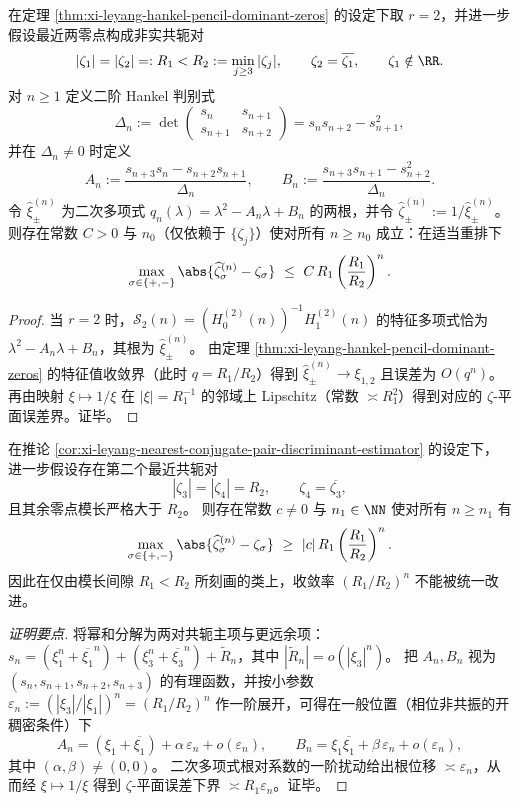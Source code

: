 \begin{corollary}\label{cor:xi-leyang-nearest-conjugate-pair-discriminant-estimator}
在定理 \ref{thm:xi-leyang-hankel-pencil-dominant-zeros} 的设定下取 \(r=2\)，并进一步假设最近两零点构成非实共轭对
\[
|\zeta_1|=|\zeta_2|=:R_1<R_2:=\min_{j\ge 3}|\zeta_j|,\qquad \zeta_2=\overline{\zeta_1},\qquad \zeta_1\notin\RR.
\]
对 \(n\ge 1\) 定义二阶 Hankel 判别式
\[
\Delta_n:=\det\begin{pmatrix}
s_n & s_{n+1}\\
s_{n+1} & s_{n+2}
\end{pmatrix}
=s_ns_{n+2}-s_{n+1}^2,
\]
并在 \(\Delta_n\neq 0\) 时定义
\[
A_n:=\frac{s_{n+3}s_n-s_{n+2}s_{n+1}}{\Delta_n},\qquad
B_n:=\frac{s_{n+3}s_{n+1}-s_{n+2}^2}{\Delta_n}.
\]
令 \(\widehat\xi_\pm^{(n)}\) 为二次多项式 \(q_n(\lambda)=\lambda^2-A_n\lambda+B_n\) 的两根，并令 \(\widehat\zeta_\pm^{(n)}:=1/\widehat\xi_\pm^{(n)}\)。
则存在常数 \(C>0\) 与 \(n_0\)（仅依赖于 \(\{\zeta_j\}\)）使对所有 \(n\ge n_0\) 成立：在适当重排下
\[
\max_{\sigma\in\{+,-\}}\abs{\widehat\zeta_\sigma^{(n)}-\zeta_\sigma}
\ \le\ C\,R_1\left(\frac{R_1}{R_2}\right)^{n}.
\]
\end{corollary}
\begin{proof}
当 \(r=2\) 时，\(\mathcal{S}_2(n)=(H_0^{(2)}(n))^{-1}H_1^{(2)}(n)\) 的特征多项式恰为
\(
\lambda^2-A_n\lambda+B_n
\)，其根为 \(\widehat\xi_\pm^{(n)}\)。
由定理 \ref{thm:xi-leyang-hankel-pencil-dominant-zeros} 的特征值收敛界（此时 \(q=R_1/R_2\)）得到
\(\widehat\xi_\pm^{(n)}\to \xi_{1,2}\) 且误差为 \(O(q^n)\)。
再由映射 \(\xi\mapsto 1/\xi\) 在 \(|\xi|=R_1^{-1}\) 的邻域上 Lipschitz（常数 \(\asymp R_1^2\)）得到对应的 \(\zeta\)-平面误差界。证毕。
\end{proof}

\begin{proposition}[指数收敛率的一般锐性]\label{prop:xi-leyang-exponential-rate-sharpness}
在推论 \ref{cor:xi-leyang-nearest-conjugate-pair-discriminant-estimator} 的设定下，进一步假设存在第二个最近共轭对
\[
|\zeta_3|=|\zeta_4|=R_2,\qquad \zeta_4=\overline{\zeta_3},
\]
且其余零点模长严格大于 \(R_2\)。
则存在常数 \(c\neq 0\) 与 \(n_1\in\NN\) 使对所有 \(n\ge n_1\) 有
\[
\max_{\sigma\in\{+,-\}}\abs{\widehat\zeta_\sigma^{(n)}-\zeta_\sigma}
\ \ge\ |c|\,R_1\left(\frac{R_1}{R_2}\right)^{n}.
\]
因此在仅由模长间隙 \(R_1<R_2\) 所刻画的类上，收敛率 \((R_1/R_2)^n\) 不能被统一改进。
\end{proposition}
\begin{proof}[证明要点]
将幂和分解为两对共轭主项与更远余项：
\(
s_n=(\xi_1^n+\overline{\xi_1}^n)+(\xi_3^n+\overline{\xi_3}^n)+\widetilde R_n
\)，其中 \(|\widetilde R_n|=o(|\xi_3|^n)\)。
把 \(A_n,B_n\) 视为 \((s_n,s_{n+1},s_{n+2},s_{n+3})\) 的有理函数，并按小参数
\(
\varepsilon_n:=(|\xi_3|/|\xi_1|)^n=(R_1/R_2)^n
\)
作一阶展开，可得在一般位置（相位非共振的开稠密条件）下
\[
A_n=(\xi_1+\overline{\xi_1})+\alpha\,\varepsilon_n+o(\varepsilon_n),\qquad
B_n=\xi_1\overline{\xi_1}+\beta\,\varepsilon_n+o(\varepsilon_n),
\]
其中 \((\alpha,\beta)\neq (0,0)\)。
二次多项式根对系数的一阶扰动给出根位移 \(\asymp \varepsilon_n\)，从而经 \(\xi\mapsto 1/\xi\) 得到 \(\zeta\)-平面误差下界 \(\asymp R_1\varepsilon_n\)。证毕。
\end{proof}

